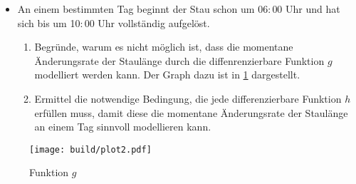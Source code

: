 \begin{itemize}
     \item An einem bestimmten Tag beginnt der Stau schon um 06$:$00 Uhr und hat sich bis um 10$:$00 Uhr vollständig aufgelöst.
         \begin{enumerate}
             \item Begründe, warum es nicht möglich ist, dass die momentane Änderungsrate der Staulänge durch die diffenrenzierbare Funktion $g$ modelliert werden kann.
                 Der Graph dazu ist in \ref{fig:g} dargestellt.
            \item Ermittel die notwendige Bedingung, die jede differenzierbare Funktion $h$ erfüllen muss, damit diese die momentane Änderungsrate der Staulänge an einem Tag sinnvoll modellieren kann.
        \end{enumerate}
\end{itemize}
\begin{figure}
    \centering
    \texttt{[image: build/plot2.pdf]}
    \caption{Funktion $g$}
    \label{fig:g}
\end{figure}


